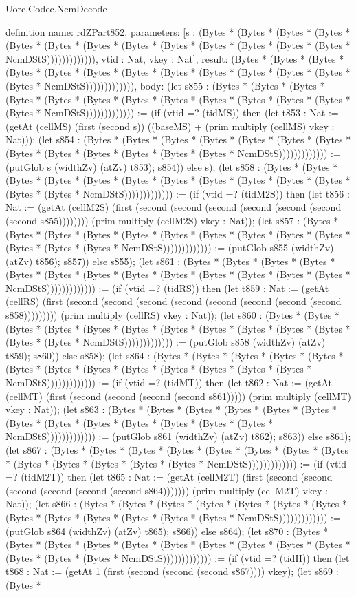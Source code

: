 \begin{lexlean}{Uorc.Codec.NcmDecode}
\begin{semanticmodule}
definition{
  name: rdZPart852,
  parameters: [s : (Bytes * (Bytes * (Bytes * (Bytes * (Bytes * (Bytes * (Bytes * (Bytes * (Bytes * (Bytes * (Bytes * (Bytes * (Bytes * NcmDStS))))))))))))), vtid : Nat, vkey : Nat],
  result: (Bytes * (Bytes * (Bytes * (Bytes * (Bytes * (Bytes * (Bytes * (Bytes * (Bytes * (Bytes * (Bytes * (Bytes * (Bytes * NcmDStS))))))))))))),
  body: (let s855 : (Bytes * (Bytes * (Bytes * (Bytes * (Bytes * (Bytes * (Bytes * (Bytes * (Bytes * (Bytes * (Bytes * (Bytes * (Bytes * NcmDStS))))))))))))) := (if (vtid =? (tidMS)) then (let t853 : Nat := (getAt (cellMS) (first (second s)) ((baseMS) + (prim multiply (cellMS) vkey : Nat))); (let s854 : (Bytes * (Bytes * (Bytes * (Bytes * (Bytes * (Bytes * (Bytes * (Bytes * (Bytes * (Bytes * (Bytes * (Bytes * (Bytes * NcmDStS))))))))))))) := (putGlob s (widthZv) (atZv) t853); s854)) else s); (let s858 : (Bytes * (Bytes * (Bytes * (Bytes * (Bytes * (Bytes * (Bytes * (Bytes * (Bytes * (Bytes * (Bytes * (Bytes * (Bytes * NcmDStS))))))))))))) := (if (vtid =? (tidM2S)) then (let t856 : Nat := (getAt (cellM2S) (first (second (second (second (second (second (second (second s855)))))))) (prim multiply (cellM2S) vkey : Nat)); (let s857 : (Bytes * (Bytes * (Bytes * (Bytes * (Bytes * (Bytes * (Bytes * (Bytes * (Bytes * (Bytes * (Bytes * (Bytes * (Bytes * NcmDStS))))))))))))) := (putGlob s855 (widthZv) (atZv) t856); s857)) else s855); (let s861 : (Bytes * (Bytes * (Bytes * (Bytes * (Bytes * (Bytes * (Bytes * (Bytes * (Bytes * (Bytes * (Bytes * (Bytes * (Bytes * NcmDStS))))))))))))) := (if (vtid =? (tidRS)) then (let t859 : Nat := (getAt (cellRS) (first (second (second (second (second (second (second (second (second s858))))))))) (prim multiply (cellRS) vkey : Nat)); (let s860 : (Bytes * (Bytes * (Bytes * (Bytes * (Bytes * (Bytes * (Bytes * (Bytes * (Bytes * (Bytes * (Bytes * (Bytes * (Bytes * NcmDStS))))))))))))) := (putGlob s858 (widthZv) (atZv) t859); s860)) else s858); (let s864 : (Bytes * (Bytes * (Bytes * (Bytes * (Bytes * (Bytes * (Bytes * (Bytes * (Bytes * (Bytes * (Bytes * (Bytes * (Bytes * NcmDStS))))))))))))) := (if (vtid =? (tidMT)) then (let t862 : Nat := (getAt (cellMT) (first (second (second (second (second s861))))) (prim multiply (cellMT) vkey : Nat)); (let s863 : (Bytes * (Bytes * (Bytes * (Bytes * (Bytes * (Bytes * (Bytes * (Bytes * (Bytes * (Bytes * (Bytes * (Bytes * (Bytes * NcmDStS))))))))))))) := (putGlob s861 (widthZv) (atZv) t862); s863)) else s861); (let s867 : (Bytes * (Bytes * (Bytes * (Bytes * (Bytes * (Bytes * (Bytes * (Bytes * (Bytes * (Bytes * (Bytes * (Bytes * (Bytes * NcmDStS))))))))))))) := (if (vtid =? (tidM2T)) then (let t865 : Nat := (getAt (cellM2T) (first (second (second (second (second (second (second s864))))))) (prim multiply (cellM2T) vkey : Nat)); (let s866 : (Bytes * (Bytes * (Bytes * (Bytes * (Bytes * (Bytes * (Bytes * (Bytes * (Bytes * (Bytes * (Bytes * (Bytes * (Bytes * NcmDStS))))))))))))) := (putGlob s864 (widthZv) (atZv) t865); s866)) else s864); (let s870 : (Bytes * (Bytes * (Bytes * (Bytes * (Bytes * (Bytes * (Bytes * (Bytes * (Bytes * (Bytes * (Bytes * (Bytes * (Bytes * NcmDStS))))))))))))) := (if (vtid =? (tidH)) then (let t868 : Nat := (getAt 1 (first (second (second (second s867)))) vkey); (let s869 : (Bytes * }
\end{semanticmodule}
\end{lexlean}
